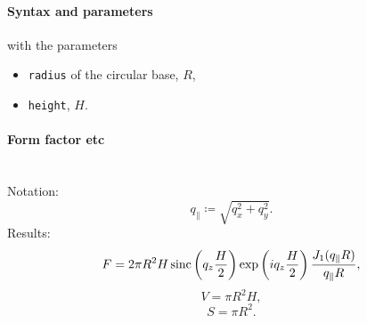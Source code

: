 \paragraph{Syntax and parameters}
\begin{quote}
\end{quote}
with the parameters
\begin{itemize}
\item \texttt{radius} of the circular base, $R$, 
\item \texttt{height}, $H$.
\end{itemize}


\paragraph{Form factor etc}\strut\\
Notation:
\begin{equation*}
  q_{\parallel} \coloneqq \sqrt{q_x^2+q_y^2}.
\end{equation*}
Results:
\begin{equation*}
  F=  2\pi R^2 H  \operatorname{sinc}\left(q_ z \frac{H}{2}\right) \exp\left(i q_ z \frac{H}{2}\right) 
    \frac{J_1(q_{\parallel} R )}{q_{\parallel} R },
\end{equation*}
\begin{equation*}
  V = \pi R^2 H,
\end{equation*}
\begin{equation*}
  S=\pi R^2.
\end{equation*}

